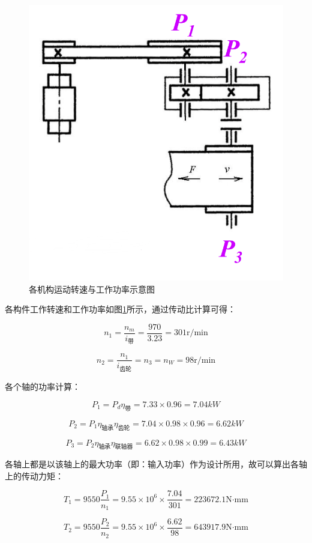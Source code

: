 \documentclass[12pt]{ctexart}
\begin{document}
\begin{figure}[htbp]
    \includegraphics[scale=0.2]{P.png}
    \caption{各机构运动转速与工作功率示意图}\label{figure1}
\end{figure}

各构件工作转速和工作功率如图\ref{figure1}所示，通过传动比计算可得：

$$n_1=\frac{n_m}{i_\text{带}}=\frac{970}{3.23}=301\text{r/min}$$

$$n_2=\frac{n_1}{i_{\text{齿轮}}}=n_3=n_W=98\text{r/min}$$

各个轴的功率计算：

$$P_1 = P_d\eta_{\text{带}}=7.33\times 0.96 = 7.04 kW$$

$$P_2 = P_1 \eta_{\text{轴承}}\eta_{\text{齿轮}}=7.04\times 0.98\times 0.96 = 6.62 kW$$

$$P_3 = P_2 \eta_{\text{轴承}}\eta_{\text{联轴器}}=6.62\times 0.98\times 0.99=6.43 kW$$

各轴上都是以该轴上的最大功率（即：输入功率）作为设计所用，故可以算出各轴上的传动力矩：

$$T_1 = 9550\frac{P_1}{n_1} = 9.55\times 10^6\times \frac{7.04}{301}=223672.1\text{N·mm}$$

$$T_2 = 9550\frac{P_2}{n_2} = 9.55\times 10^6\times \frac{6.62}{98}=643917.9\text{N·mm}$$
\end{document}
